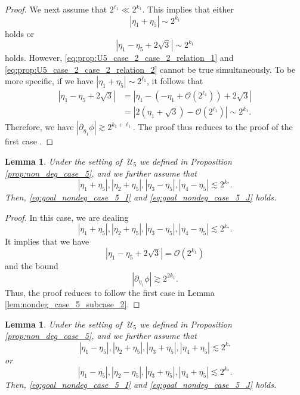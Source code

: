\documentclass[reqno,english,11pt]{amsart}
\newtheorem{lemma}[theorem]{Lemma}
\theoremstyle{definition}
\numberwithin{equation}{section}
\begin{document}
\begin{proof}
     We next assume that $2^{\ell_1}\ll 2^{k_1}$. This implies that either 
     \begin{equation}\label{eq:prop:U5_case_2_case_2_relation_1}
        |\eta_1+\eta_5|\sim 2^{k_1}
     \end{equation}
     holds or
     \begin{equation}\label{eq:prop:U5_case_2_case_2_relation_2}
     |\eta_1-\eta_5+2\sqrt{3}|\sim 2^{k_1}
     \end{equation}
     holds. However, \eqref{eq:prop:U5_case_2_case_2_relation_1} and \eqref{eq:prop:U5_case_2_case_2_relation_2} cannot be true simultaneously. To be more specific, if we have $|\eta_1+\eta_5|\sim 2^{\ell_1}$, it follows that 
     \begin{align*}
         |\eta_1-\eta_5+2\sqrt{3}|&=|\eta_1-\left(-\eta_1+\mathcal{O}(2^{\ell_1})\right)+2\sqrt{3}|\\
         &=|2(\eta_1+\sqrt{3})-\mathcal{O}(2^{\ell_1})|\sim 2^{k_1}.
     \end{align*}
    Therefore, we have $|\partial_{\eta_1}\phi|\gtrsim 2^{k_1+\ell_1}$. The proof thus reduces to the proof of the first case . 
    \end{proof}
\begin{lemma}\label{lem:nondeg_case_5_subcase_3}
   Under the setting of $\;\mathcal{U}_5$ we defined in Proposition \ref{prop:non_deg_case_5}, and we further assume that
    $$|\eta_1+\eta_5|, |\eta_2+\eta_5|, |\eta_3-\eta_5|,|\eta_4-\eta_5|\lesssim 2^{k_*}.$$
    Then, \eqref{eq:goal_nondeg_case_5_I} and \eqref{eq:goal_nondeg_case_5_J} holds.
\end{lemma}
\begin{proof}
    In this case, we are dealing 
    $$|\eta_1+\eta_5|, |\eta_2+\eta_5|, |\eta_3-\eta_5|,|\eta_4-\eta_5|\lesssim 2^{k_*}.$$ It implies that we have
    $$\left|\eta_1-\eta_5+2\sqrt{3}\right|=\mathcal{O}(2^{k_1})$$
    and the bound
    $$|\partial_{\eta_1}\phi|\gtrsim 2^{2k_1}.$$
    Thus, the proof reduces to follow the first case in Lemma \ref{lem:nondeg_case_5_subcase_2}.
\end{proof}
\begin{lemma}\label{lem:nondeg_case_5_subcase_4}
   Under the setting of $\;\mathcal{U}_5$ we defined in Proposition \ref{prop:non_deg_case_5}, and we further assume that
    $$|\eta_1-\eta_5|, |\eta_2+\eta_5|, |\eta_3+\eta_5|,|\eta_4+\eta_5|\lesssim 2^{k_*}$$
    or
    $$|\eta_1-\eta_5|, |\eta_2-\eta_5|, |\eta_3+\eta_5|,|\eta_4+\eta_5|\lesssim 2^{k_*}.$$
    Then, \eqref{eq:goal_nondeg_case_5_I} and \eqref{eq:goal_nondeg_case_5_J} holds.
\end{lemma}
\end{document}
